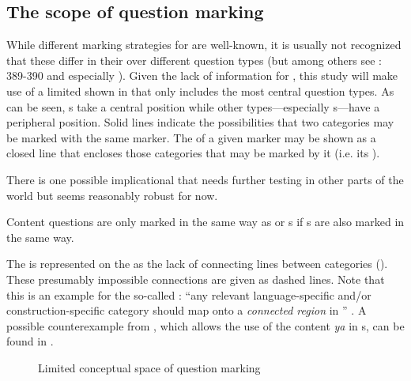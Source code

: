 \subsection{The scope of question marking}\label{sec:4.2.2}

While different marking strategies for  are well-known, it is usually not recognized that these differ in their  over different question types (but among others see \citealt{Dixon2012}: 389-390 and especially \citealt{Hölzl2015b,Hölzl2016a}). Given the lack of information for , this study will make use of a limited  shown in  that only includes the most central question types. As can be seen, s take a central position while other types---especially s---have a peripheral position. Solid lines indicate the possibilities that two categories may be marked with the same marker. The  of a given marker may be shown as a closed line that encloses those categories that may be marked by it (i.e. its ).

There is one possible implicational  that needs further testing in other parts of the world but seems reasonably robust for now.

\ea\upshape%
    \label{ex:4:27}
      Content questions are only marked in the same way as  or s if s are also marked in the same way.\\
    \z

\noindent The  is represented on the  as the lack of connecting lines between categories (). These presumably impossible connections are given as dashed lines. Note that this is an example for the so-called \textit{}: “any relevant language-specific and/or construction-specific category should map onto a \textit{connected region} in ” \citep[134]{Croft2003}. A possible counterexample from , which allows the use of the content  \textit{ya} in s, can be found in .

\begin{figure}
\caption{Limited conceptual space of question marking}
\label{fig:4:1}
\end{figure}

